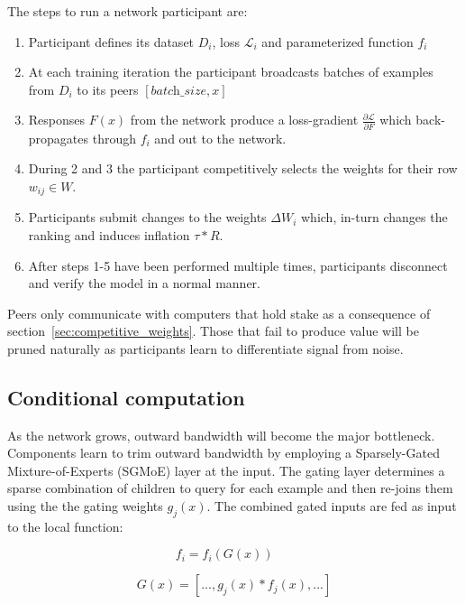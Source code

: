 \documentclass{article}
\begin{document}
The steps to run a network participant are:
\begin{enumerate}
	
	\item Participant defines its dataset $D_i$, loss $\mathcal{L}_i$ and parameterized function $f_i$
	\item  At each training iteration the participant broadcasts batches of examples from $D_i$ to its peers $[\textit{batch\_size}, x]$
	\item Responses $F(x)$ from the network produce a loss-gradient $\frac{\partial \mathcal{L}}{\partial F}$ which back-propagates through $f_i$ and out to the network.
	\item  During 2 and 3 the participant competitively selects the weights for their row $w_{ij} \in W$.
	\item  Participants submit changes to the weights $\Delta W_i$ which, in-turn changes the ranking and induces inflation $\tau * R$.
	\item  After steps 1-5 have been performed multiple times, participants disconnect and verify the model in a normal manner.
\end{enumerate}

Peers only communicate with computers that hold stake as a consequence of section~\ref{sec:competitive_weights}. Those that fail to produce value will be pruned naturally as participants learn to differentiate signal from noise.

\subsection{Conditional computation}

As the network grows, outward bandwidth will become the major bottleneck. Components learn to trim outward bandwidth by employing a Sparsely-Gated Mixture-of-Experts (SGMoE) \cite{shazeer2017outrageously} layer at the input. The gating layer determines a sparse combination of children to query for each example and then re-joins them using the the gating weights $g_j(x)$. The combined gated inputs are fed as input to the local function: 

\begin{equation}
f_i = f_i(G(x)) \ \ \ \  \textrm{ }
\end{equation}

\begin{equation}
\label{eq:gating_ensemble}
G(x) = [ ..., g_j(x) * f_j(x), ...]
\end{equation}
\end{document}
